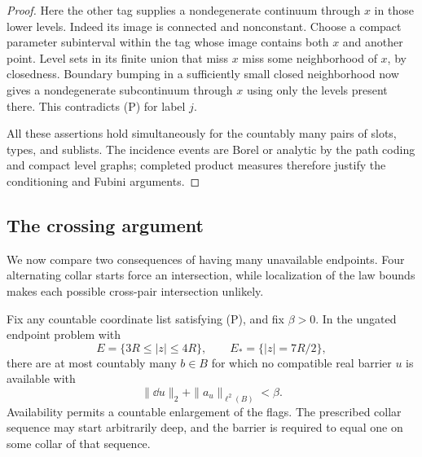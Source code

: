 \begin{proof}
Here the other tag supplies a nondegenerate continuum through $x$ in
those lower levels.  Indeed its image is connected and nonconstant.
Choose a compact parameter subinterval within the tag whose image
contains both $x$ and another point.  Level sets in its finite union
that miss $x$ miss some neighborhood of $x$, by closedness.  Boundary
bumping in a sufficiently small closed neighborhood now gives a
nondegenerate subcontinuum through $x$ using only the levels present
there.  This contradicts \textup{(P)} for label $j$.

All these assertions hold simultaneously for the countably many pairs
of slots, types, and sublists.  The incidence events are Borel or
analytic by the path coding and compact level graphs; completed product
measures therefore justify the conditioning and Fubini arguments.
\end{proof}

\subsection{The crossing argument}

We now compare two consequences of having many unavailable endpoints.
Four alternating collar starts force an intersection, while localization
of the law bounds makes each possible cross-pair intersection unlikely.

\begin{theorem}
\label{thm:countable-exceptions}
Fix any countable coordinate list satisfying \textup{(P)}, and fix
$\beta>0$.  In the ungated endpoint problem with
\[
 E=\{3R\le |z|\le4R\},
 \qquad E_* =\{|z|=7R/2\},
\]
there are at most countably many $b\in B$ for which no compatible real
barrier $u$ is available with
\[
 \|\dd u\|_2+\|a_u\|_{\ell^2(B)}<\beta.
\]
Availability permits a countable enlargement of the flags.  The
prescribed collar sequence may start arbitrarily deep, and the barrier
is required to equal one on some collar of that sequence.
\end{theorem}


